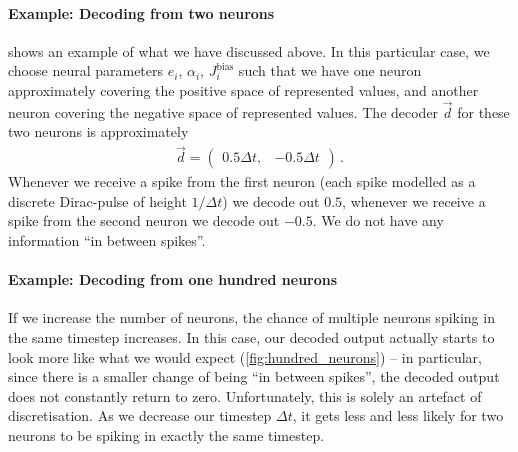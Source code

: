 \documentclass[10pt,letterpaper,oneside]{article}
\begin{document}

\paragraph{Example: Decoding from two neurons}
 shows an example of what we have discussed above. In this particular case, we choose neural parameters $e_i$, $\alpha_i$, $J^\mathrm{bias}_i$ such that we have one neuron approximately covering the positive space of represented values, and another neuron covering the negative space of represented values. The decoder $\vec d$ for these two neurons is approximately
\begin{align*}
	\vec d = \begin{pmatrix} 0.5 \Delta t, & -0.5 \Delta t \end{pmatrix} \,.
\end{align*}
Whenever we receive a spike from the first neuron (each spike modelled as a discrete Dirac-pulse of height $1/\Delta t$) we decode out $0.5$, whenever we receive a spike from the second neuron we decode out $-0.5$. We do not have any information \enquote{in between spikes}.

\paragraph{Example: Decoding from one hundred neurons}
If we increase the number of neurons, the chance of multiple neurons spiking in the same timestep increases. In this case, our decoded output actually starts to look more like what we would expect (\cref{fig:hundred_neurons}) -- in particular, since there is a smaller change of being \enquote{in between spikes}, the decoded output does not constantly return to zero. Unfortunately, this is solely an artefact of discretisation. As we decrease our timestep $\Delta t$, it gets less and less likely for two neurons to be spiking in exactly the same timestep.
\end{document}
